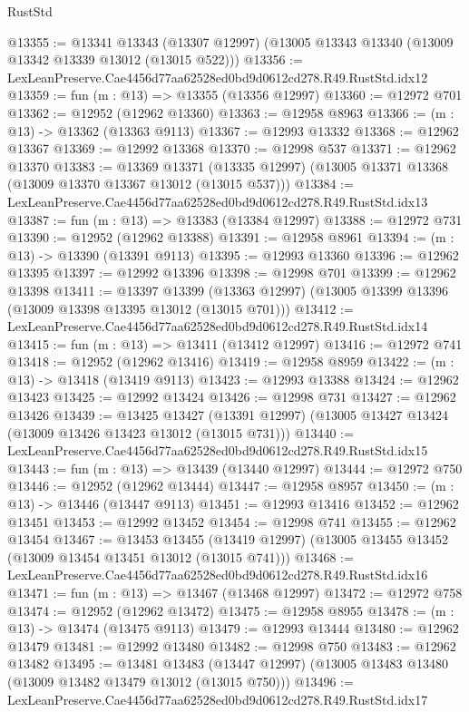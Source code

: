 \begin{lexlean}{RustStd}
\begin{coremodule}
@13355 := @13341
    @13343
    (@13307 @12997)
    (@13005 @13343 @13340 (@13009 @13342 @13339 @13012 (@13015 @522)))
@13356 := LexLeanPreserve.Cae4456d77aa62528ed0bd9d0612cd278.R49.RustStd.idx12
@13359 := fun (m : @13) => @13355 (@13356 @12997)
@13360 := @12972 @701
@13362 := @12952 (@12962 @13360)
@13363 := @12958 @8963
@13366 := (m : @13) -> @13362 (@13363 @9113)
@13367 := @12993 @13332
@13368 := @12962 @13367
@13369 := @12992 @13368
@13370 := @12998 @537
@13371 := @12962 @13370
@13383 := @13369
    @13371
    (@13335 @12997)
    (@13005 @13371 @13368 (@13009 @13370 @13367 @13012 (@13015 @537)))
@13384 := LexLeanPreserve.Cae4456d77aa62528ed0bd9d0612cd278.R49.RustStd.idx13
@13387 := fun (m : @13) => @13383 (@13384 @12997)
@13388 := @12972 @731
@13390 := @12952 (@12962 @13388)
@13391 := @12958 @8961
@13394 := (m : @13) -> @13390 (@13391 @9113)
@13395 := @12993 @13360
@13396 := @12962 @13395
@13397 := @12992 @13396
@13398 := @12998 @701
@13399 := @12962 @13398
@13411 := @13397
    @13399
    (@13363 @12997)
    (@13005 @13399 @13396 (@13009 @13398 @13395 @13012 (@13015 @701)))
@13412 := LexLeanPreserve.Cae4456d77aa62528ed0bd9d0612cd278.R49.RustStd.idx14
@13415 := fun (m : @13) => @13411 (@13412 @12997)
@13416 := @12972 @741
@13418 := @12952 (@12962 @13416)
@13419 := @12958 @8959
@13422 := (m : @13) -> @13418 (@13419 @9113)
@13423 := @12993 @13388
@13424 := @12962 @13423
@13425 := @12992 @13424
@13426 := @12998 @731
@13427 := @12962 @13426
@13439 := @13425
    @13427
    (@13391 @12997)
    (@13005 @13427 @13424 (@13009 @13426 @13423 @13012 (@13015 @731)))
@13440 := LexLeanPreserve.Cae4456d77aa62528ed0bd9d0612cd278.R49.RustStd.idx15
@13443 := fun (m : @13) => @13439 (@13440 @12997)
@13444 := @12972 @750
@13446 := @12952 (@12962 @13444)
@13447 := @12958 @8957
@13450 := (m : @13) -> @13446 (@13447 @9113)
@13451 := @12993 @13416
@13452 := @12962 @13451
@13453 := @12992 @13452
@13454 := @12998 @741
@13455 := @12962 @13454
@13467 := @13453
    @13455
    (@13419 @12997)
    (@13005 @13455 @13452 (@13009 @13454 @13451 @13012 (@13015 @741)))
@13468 := LexLeanPreserve.Cae4456d77aa62528ed0bd9d0612cd278.R49.RustStd.idx16
@13471 := fun (m : @13) => @13467 (@13468 @12997)
@13472 := @12972 @758
@13474 := @12952 (@12962 @13472)
@13475 := @12958 @8955
@13478 := (m : @13) -> @13474 (@13475 @9113)
@13479 := @12993 @13444
@13480 := @12962 @13479
@13481 := @12992 @13480
@13482 := @12998 @750
@13483 := @12962 @13482
@13495 := @13481
    @13483
    (@13447 @12997)
    (@13005 @13483 @13480 (@13009 @13482 @13479 @13012 (@13015 @750)))
@13496 := LexLeanPreserve.Cae4456d77aa62528ed0bd9d0612cd278.R49.RustStd.idx17

\end{coremodule}
\end{lexlean}
